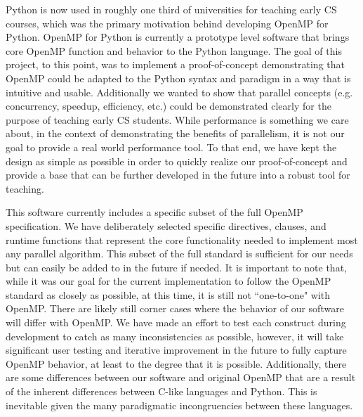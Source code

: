 \documentclass[letterpaper,12pt]{article} %
\begin{document}
Python is now used in roughly one third of universities for teaching early CS courses, which was the primary motivation behind developing OpenMP for Python. OpenMP for Python is currently a prototype level software that brings core OpenMP function and behavior to the Python language. The goal of this project, to this point, was to implement a proof-of-concept demonstrating that OpenMP could be adapted to the Python syntax and paradigm in a way that is intuitive and usable. Additionally we wanted to show that parallel concepts (e.g. concurrency, speedup, efficiency, etc.) could be demonstrated clearly for the purpose of teaching early CS students. While performance is something we care about, in the context of demonstrating the benefits of parallelism, it is not our goal to provide a real world performance tool. To that end, we have kept the design as simple as possible in order to quickly realize our proof-of-concept and provide a base that can be further developed in the future into a robust tool for teaching. 

This software currently includes a specific subset of the full OpenMP specification. We have deliberately selected specific directives, clauses, and runtime functions that represent the core functionality needed to implement most any parallel algorithm. This subset of the full standard is sufficient for our needs but can easily be added to in the future if needed. It is important to note that, while it was our goal for the current implementation to follow the OpenMP standard as closely as possible, at this time, it is still not ``one-to-one" with OpenMP. There are likely still corner cases where the behavior of our software will differ with OpenMP. We have made an effort to test each construct during development to catch as many inconsistencies as possible, however, it will take significant user testing and iterative improvement in the future to fully capture OpenMP behavior, at least to the degree that it is possible. Additionally, there are some differences between our software and original OpenMP that are a result of the inherent differences between C-like languages and Python. This is inevitable given the many paradigmatic incongruencies between these languages. 
\end{document}
